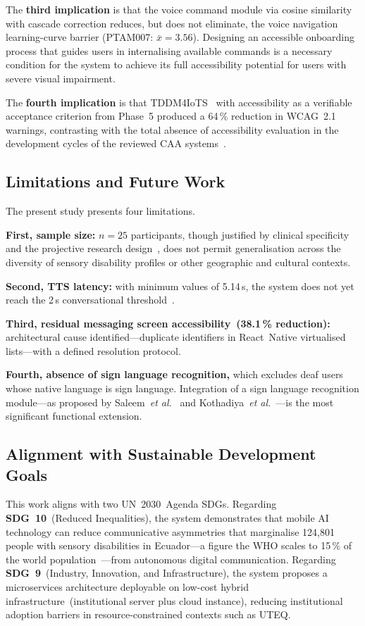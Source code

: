 \documentclass[journal]{IEEEtran}
\begin{document}
	The \textbf{third implication} is that the voice command module
	via cosine similarity with cascade correction reduces, but does
	not eliminate, the voice navigation learning-curve barrier
	(PTAM007: $\bar{x}{=}3.56$).
	Designing an accessible onboarding process that guides users
	in internalising available commands is a necessary condition
	for the system to achieve its full accessibility potential
	for users with severe visual impairment.
	
	The \textbf{fourth implication} is that TDDM4IoTS~\cite{guerrero2020}
	with accessibility as a verifiable acceptance criterion from Phase~5
	produced a 64\,\% reduction in WCAG~2.1 warnings, contrasting
	with the total absence of accessibility evaluation in the
	development cycles of the reviewed CAA
	systems~\cite{costanzo2023,mateos2022,janaka2023}.
	
	\subsection{Limitations and Future Work}
	The present study presents four limitations.
	
	\textbf{First, sample size:} $n{=}25$ participants, though
	justified by clinical specificity and the projective research
	design~\cite{hernandez2014}, does not permit generalisation
	across the diversity of sensory disability profiles or other
	geographic and cultural contexts.
	
	\textbf{Second, TTS latency:} with minimum values of 5.14\,s,
	the system does not yet reach the 2\,s conversational
	threshold~\cite{tan2021}.
	
	\textbf{Third, residual messaging screen accessibility~(38.1\,\%
		reduction):} architectural cause identified---duplicate identifiers
	in React~Native virtualised lists---with a defined resolution protocol.
	
	\textbf{Fourth, absence of sign language recognition,}
	which excludes deaf users whose native language is sign language.
	Integration of a sign language recognition module---as proposed by
	Saleem~\textit{et al.}~\cite{saleem2023} and
	Kothadiya~\textit{et al.}~\cite{kothadiya2022}---is the most
	significant functional extension.
	
	\subsection{Alignment with Sustainable Development Goals}
	This work aligns with two UN~2030~Agenda SDGs.
	Regarding \textbf{SDG~10}~(Reduced Inequalities), the system
	demonstrates that mobile AI technology can reduce communicative
	asymmetries that marginalise 124{,}801 people with sensory
	disabilities in Ecuador---a figure the WHO scales to 15\,\% of
	the world population~\cite{who2011}---from autonomous digital
	communication.
	Regarding \textbf{SDG~9}~(Industry, Innovation, and
	Infrastructure), the system proposes a microservices architecture
	deployable on low-cost hybrid infrastructure~(institutional server
	plus cloud instance), reducing institutional adoption barriers in
	resource-constrained contexts such as UTEQ.
	
\end{document}
